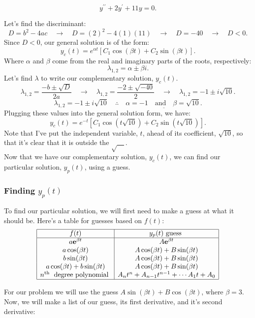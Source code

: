 \documentclass[a4paper,12pt]{article}
\begin{document}
$$ y^{\prime \prime}+2 y^{\prime}+11 y = 0 .$$

Let's find the discriminant:
$$ D = b^2 - 4ac\quad\rightarrow \quad D =  (2)^2 - 4(1)(11) \quad\rightarrow \quad D = -40 \quad\rightarrow\quad D<0.$$
Since $D<0$, our general solution is of the form:
$$ y_c(t) = e^{\alpha t}\left[C_1\cos(\beta t) + C_2\sin(\beta t)\right]. $$
Where $\alpha$ and $\beta$ come from the real and imaginary parts of the roots, respectively:
$$ \lambda_{1,2} = \alpha \pm \beta i. $$
Let's find $\lambda$ to write our complementary solution, $y_c(t)$.
$$ \lambda_{1,2} = \frac{-b \pm \sqrt{D}}{2a} \quad\rightarrow \quad \lambda_{1,2} = \frac{-2 \pm \sqrt{-40}}{2} \quad\rightarrow \quad \lambda_{1,2} = -1 \pm i\sqrt{10}. $$
$$ \lambda_{1,2} = -1 \pm i\sqrt{10} \quad\therefore\quad \underline{\alpha = -1 \quad\text{and}\quad \beta=\sqrt{10}.} $$
Plugging these values into the general solution form, we have:
$$\boxed{ y_c(t) = e^{-t}\left[C_1\cos{\left(t\sqrt{10}\right)} + C_2\sin{\left(t\sqrt{10}\right)}\right]. }$$
Note that I've put the independent variable, $t$, ahead of its coefficient, $\sqrt{10}$, so that it's clear that it is outside the $\sqrt{\quad}$.\\

Now that we have our complementary solution, $y_c(t)$, we can find our particular solution, $y_p(t)$, using a guess.
\subsubsection*{Finding $y_p(t)$}
To find our particular solution, we will first need to make a guess at what it should be. Here's a table for guesses based on $f(t)$:
$$ \begin{array}{|c|c|}
\hline f(t) & y_p(t) \text { guess } \\
\hline a \mathbf{e}^{\beta t} & A \mathbf{e}^{\beta t} \\
a \cos (\beta t) & A \cos (\beta t)+B \sin (\beta t) \\
b \sin (\beta t) & A \cos (\beta t)+B \sin (\beta t) \\
a \cos (\beta t)+b \sin (\beta t) & A \cos (\beta t)+B \sin (\beta t) \\
n^{\text {th }} \text { degree polynomial } & A_n t^n+A_{n-1} t^{n-1}+\cdots A_1 t+A_0 \\
\hline
\end{array} $$

For our problem we will use the guess $A\sin(\beta t) + B\cos(\beta t)$, where $\beta = 3.$\\
Now, we will make a list of our guess, its first derivative, and it's second derivative:
\end{document}
